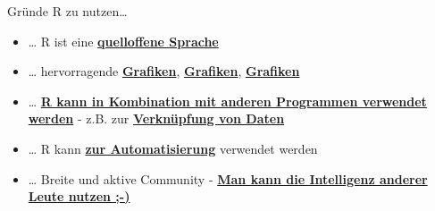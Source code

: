 \documentclass[ignorenonframetext,]{beamer}
\begin{document}
\begin{frame}{Gründe R zu nutzen\ldots{}}
\protect\hypertarget{grunde-r-zu-nutzen}{}

\begin{itemize}
\item
  \ldots{} R ist eine
  \href{https://stackoverflow.com/questions/1546583/what-is-the-definition-of-an-open-source-programming-language}{\textbf{quelloffene
  Sprache}}
\item
  \ldots{} hervorragende
  \href{http://matthewlincoln.net/2014/12/20/adjacency-matrix-plots-with-r-and-ggplot2.html}{\textbf{Grafiken}},
  \href{https://www.r-bloggers.com/3d-plots-with-ggplot2-and-plotly\%20/}{\textbf{Grafiken}},
  \href{https://procomun.wordpress.com/2011/03/18/splomr/}{\textbf{Grafiken}}
\item
  \ldots{} \href{https://github.com/Japhilko/RInterfaces}{\textbf{R kann
  in Kombination mit anderen Programmen verwendet werden}} - z.B. zur
  \href{https://github.com/Japhilko/RInterfaces/blob/master/slides/Datenimport.md}{\textbf{Verknüpfung
  von Daten}}
\item
  \ldots{} R kann
  \href{https://cran.r-project.org/web/packages/MplusAutomation/index.html}{\textbf{zur
  Automatisierung}} verwendet werden
\item
  \ldots{} Breite und aktive Community -
  \href{https://www.r-bloggers.com/}{\textbf{Man kann die Intelligenz
  anderer Leute nutzen ;-)}}
\end{itemize}

\end{frame}
\end{document}
